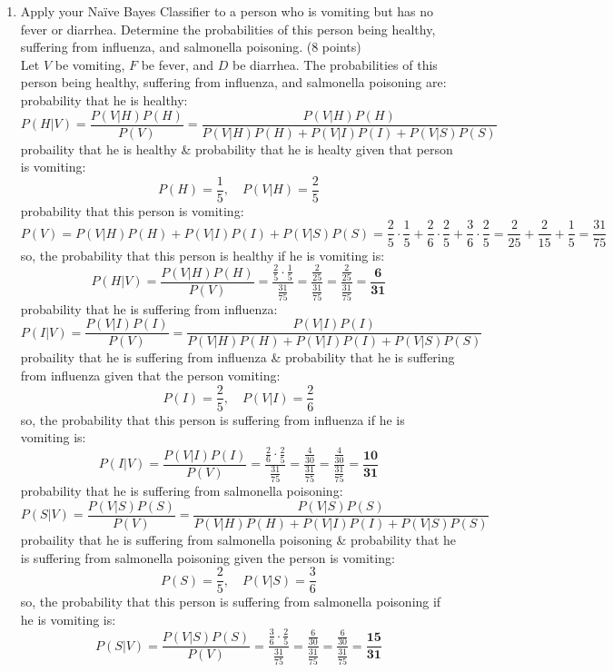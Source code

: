 \documentclass[a3paper,12pt]{article} %
\begin{document}
\begin{enumerate}
    \item Apply your Na\"ive Bayes Classifier to a person who is vomiting but has no fever or diarrhea. Determine the probabilities of this person being healthy, suffering from influenza, and salmonella poisoning. (8 points)
    \\ Let \( V \) be vomiting, \( F \) be fever, and \( D \) be diarrhea. The probabilities of this person being healthy, suffering from influenza, and salmonella poisoning are:
    \\ probability that he is healthy:
    \[
    P(H|V) = \frac{P(V|H)P(H)}{P(V)} = \frac{P(V|H)P(H)}{P(V|H)P(H) + P(V|I)P(I) + P(V|S)P(S)}
    \]
    probaility that he is healthy \& probability that he is healty given that person is vomiting:
    \[
    P(H) = \frac{1}{5}, \quad P(V|H) = \frac{2}{5}
    \]
    probability that this person is vomiting:
    \[
    P(V) = P(V|H)P(H) + P(V|I)P(I) + P(V|S)P(S) = \frac{2}{5} \cdot \frac{1}{5} + \frac{2}{6} \cdot \frac{2}{5} + \frac{3}{6} \cdot \frac{2}{5} = \frac{2}{25} + \frac{2}{15} + \frac{1}{5} = \frac{31}{75}
    \]
    so, the probability that this person is healthy if he is vomiting is:
    \[
    P(H|V) = \frac{P(V|H)P(H)}{P(V)} = \frac{\frac{2}{5} \cdot \frac{1}{5}}{\frac{31}{75}} = \frac{\frac{2}{25}}{\frac{31}{75}} = \frac{\frac{2}{25}}{\frac{31}{75}} = \mathbf{\frac{6}{31}}
    \]
    probability that he is suffering from influenza:
    \[
    P(I|V) = \frac{P(V|I)P(I)}{P(V)} = \frac{P(V|I)P(I)}{P(V|H)P(H) + P(V|I)P(I) + P(V|S)P(S)}
    \]
    probaility that he is suffering from influenza \& probability that he is suffering from influenza given that the person vomiting:
    \[
    P(I) = \frac{2}{5}, \quad P(V|I) = \frac{2}{6}
    \]
    so, the probability that this person is suffering from influenza if he is vomiting is:
    \[
    P(I|V) = \frac{P(V|I)P(I)}{P(V)} = \frac{\frac{2}{6} \cdot \frac{2}{5}}{\frac{31}{75}} = \frac{\frac{4}{30}}{\frac{31}{75}} = \frac{\frac{4}{30}}{\frac{31}{75}} = \mathbf{\frac{10}{31}}
    \]
    probability that he is suffering from salmonella poisoning:
    \[
    P(S|V) = \frac{P(V|S)P(S)}{P(V)} = \frac{P(V|S)P(S)}{P(V|H)P(H) + P(V|I)P(I) + P(V|S)P(S)}
    \]
    probaility that he is suffering from salmonella poisoning \& probability that he is suffering from salmonella poisoning given the person is vomiting:
    \[
    P(S) = \frac{2}{5}, \quad P(V|S) = \frac{3}{6}
    \]
    so, the probability that this person is suffering from salmonella poisoning if he is vomiting is:
    \[
    P(S|V) = \frac{P(V|S)P(S)}{P(V)} = \frac{\frac{3}{6} \cdot \frac{2}{5}}{\frac{31}{75}} = \frac{\frac{6}{30}}{\frac{31}{75}} = \frac{\frac{6}{30}}{\frac{31}{75}} = \mathbf{\frac{15}{31}}
    \]

\end{enumerate}
\end{document}
